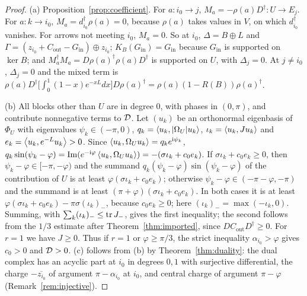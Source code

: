 \begin{proof}
(a) Proposition~\ref{prop:coefficient}. For $a:i_0\to j$,
$M_a=-\rho(a)D^\dagger:U\to E_j$. For $a:k\to i_0$, $M_a=d_{i_0}^\dagger\rho(a)=0$,
because $\rho(a)$ takes values in $V$, on which $d_{i_0}^\dagger$ vanishes.
For arrows not meeting $i_0$, $M_a=0$. So at $i_0$, $\Delta=B\oplus L$ and
$\Gamma=(z_{i_0}+C_{\mathrm{out}}-G_{\mathrm{in}})\oplus z_{i_0}$;
$K_B(G_{\mathrm{in}})=G_{\mathrm{in}}$ because $G_{\mathrm{in}}$ is supported on
$\ker B$; and $M_a^\dagger M_a=D\rho(a)^\dagger\rho(a)D^\dagger$ is supported on
$U$, with $\Delta_j=0$. At $j\neq i_0$, $\Delta_j=0$ and the mixed term is
$\rho(a)D^\dagger\bigl[\int_0^1(1-x)e^{-xL}dx\bigr]D\rho(a)^\dagger
=\rho(a)(1-R(B))\rho(a)^\dagger$.

(b) All blocks other than $U$ are in degree $0$, with phases in $(0,\pi)$,
and contribute nonnegative terms to $\mathcal D$. Let $(u_k)$ be an orthonormal
eigenbasis of $\Phi_U$ with eigenvalues $\psi_k\in(-\pi,0)$,
$q_k=\left\langle u_k,|\Omega_U|u_k\right\rangle$, $\iota_k=\left\langle u_k,Ju_k\right\rangle$ and
$e_k=\left\langle u_k,e^{-L}u_k\right\rangle>0$. Since
$\left\langle u_k,\Omega_Uu_k\right\rangle=q_ke^{\mathrm i\psi_k}$,
$q_k\sin(\psi_k-\varphi)=\operatorname{Im}(e^{-\mathrm i\varphi}\left\langle u_k,\Omega_Uu_k\right\rangle)
=-(\sigma\iota_k+c_0e_k)$. If $\sigma\iota_k+c_0e_k\geq0$, then
$\psi_k-\varphi\in[-\pi,-\varphi)$ and the summand
$q_k(\psi_k-\varphi)\sin(\psi_k-\varphi)$ of the contribution of $U$ is at
least $\varphi(\sigma\iota_k+c_0e_k)$; otherwise
$\psi_k-\varphi\in(-\pi-\varphi,-\pi)$ and the summand is at least
$(\pi+\varphi)(\sigma\iota_k+c_0e_k)$. In both cases it is at least
$\varphi(\sigma\iota_k+c_0e_k)-\pi\sigma(\iota_k)_-$, because $c_0e_k\geq0$;
here $(\iota_k)_-=\max(-\iota_k,0)$. Summing, with
$\sum_k(\iota_k)_-\leq\operatorname{tr} J_-$, gives the first inequality; the second follows from the $1/3$ estimate after
Theorem~\ref{thm:imported}, since $DC_{\mathrm{out}}D^\dagger\geq0$.
For $r=1$ we have $J\geq0$. Thus if $r=1$ or $\varphi\geq \pi/3$,
the strict inequality $\alpha_{i_0}>\varphi$ gives $c_0>0$ and $\mathcal D>0$. (c) follows from
(b) by Theorem~\ref{thm:duality}: the dual complex has an acyclic part at
$i_0$ in degrees $0,1$ with surjective differential, the charge
$-\overline{z_{i_0}}$ of argument $\pi-\alpha_{i_0}$ at $i_0$, and central
charge of argument $\pi-\varphi$ (Remark~\ref{rem:injective}).
\end{proof}

